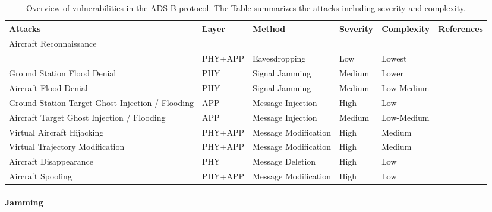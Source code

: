 \documentclass[english]{IEEEtran}
\providecommand{\tabularnewline}{\\}
\begin{document}
\begin{table*}
\begin{centering}
\begin{tabular}{|>{\centering}p{3.2cm}|>{\centering}p{1.7cm}|>{\centering}p{1.7cm}|>{\centering}p{1.7cm}|>{\centering}p{1.7cm}|>{\centering}p{1.7cm}|}
\hline 
Attacks & Layer  & Method  & Severity  & Complexity & References\tabularnewline
\hline 
\hline 
Aircraft Reconnaissance\\
 & PHY+APP & Eavesdropping & Low & Lowest & \cite{Costin,schafer2013experimental,McCallie2011}\tabularnewline
\hline 
Ground Station Flood Denial & PHY & Signal Jamming & Medium & Lower & \cite{Costin,schafer2013experimental,McCallie2011,Wilhelm2011a,Purton2010}\tabularnewline
\hline 
Aircraft Flood Denial & PHY & Signal Jamming & Medium & Low-Medium & \cite{Costin,schafer2013experimental,McCallie2011,Wilhelm2011a,Purton2010}\tabularnewline
\hline 
Ground Station Target Ghost Injection / Flooding & APP & Message Injection & High & Low & \cite{Costin,schafer2013experimental,McCallie2011}\tabularnewline
\hline 
Aircraft Target Ghost Injection / Flooding & APP & Message Injection & Medium & Low-Medium & \cite{Costin,schafer2013experimental,McCallie2011}\tabularnewline
\hline 
Virtual Aircraft Hijacking & PHY+APP & Message Modification & High & Medium & \cite{schafer2013experimental,Popper2011,Wilhelm2012}\tabularnewline
\hline 
Virtual Trajectory Modification & PHY+APP & Message Modification & High & Medium & \cite{schafer2013experimental,Popper2011,Wilhelm2012}\tabularnewline
\hline 
Aircraft Disappearance & PHY & Message Deletion & High & Low & \cite{schafer2013experimental,McCallie2011}\tabularnewline
\hline 
Aircraft Spoofing & PHY+APP & Message Modification & High & Low & \cite{Costin,schafer2013experimental,Purton2010}\tabularnewline
\hline 
\end{tabular}
\par\end{centering}

\caption{Overview of vulnerabilities in the ADS-B protocol. The Table summarizes
the attacks including severity and complexity. \label{tab:Comparison-of-vulnerabilities}}
\end{table*}



\paragraph*{Jamming}
\end{document}
